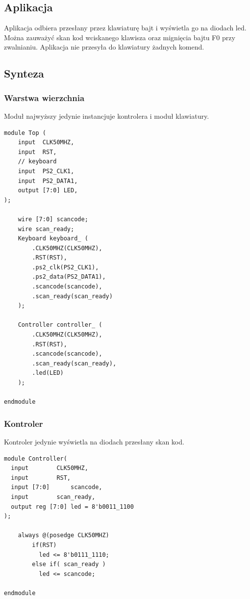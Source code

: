 \documentclass[a4paper,12pt]{article}
\begin{document}
\subsection{Aplikacja}

Aplikacja odbiera przesłany przez klawiaturę bajt i wyświetla go na diodach led. Można zauważyć skan kod wciskanego klawisza oraz mignięcia bajtu F0 przy zwalnianiu. Aplikacja nie przesyła do klawiatury żadnych komend.

\subsection{Synteza}

\subsubsection{Warstwa wierzchnia}
Moduł najwyższy jedynie instancjuje kontrolera i moduł klawiatury.
\begin{lstlisting}[label=Top,caption=Top.v]
module Top (
    input  CLK50MHZ,
    input  RST,
    // keyboard
    input  PS2_CLK1,
    input  PS2_DATA1,
    output [7:0] LED,
);

    wire [7:0] scancode;
    wire scan_ready;
    Keyboard keyboard_ (
        .CLK50MHZ(CLK50MHZ),
        .RST(RST),
        .ps2_clk(PS2_CLK1),
        .ps2_data(PS2_DATA1),
        .scancode(scancode),
        .scan_ready(scan_ready)
    );

    Controller controller_ (
        .CLK50MHZ(CLK50MHZ),
        .RST(RST),
        .scancode(scancode),
        .scan_ready(scan_ready),
        .led(LED)
    );

endmodule
\end{lstlisting}

\subsubsection{Kontroler}
Kontroler jedynie wyświetla na diodach przesłany skan kod.
\begin{lstlisting}[label=Controller,caption=Controller.v]
module Controller(
  input 	   CLK50MHZ,
  input 	   RST,
  input [7:0] 	   scancode,
  input 	   scan_ready,
  output reg [7:0] led = 8'b0011_1100
);

    always @(posedge CLK50MHZ)
        if(RST)
          led <= 8'b0111_1110;
        else if( scan_ready )
          led <= scancode;

endmodule
\end{lstlisting}
\end{document}
